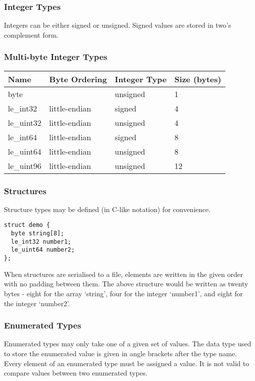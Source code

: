 \documentclass[10pt]{article}
\begin{document}
\subsubsection{Integer Types}
Integers can be either signed or unsigned.
Signed values are stored in two's complement form.

\subsubsection{Multi-byte Integer Types}
\begin{center}
\begin{tabular}{l l l l}
\hline
\textbf{Name} & \textbf{Byte Ordering} & \textbf{Integer Type} & \textbf{Size (bytes)} \\
\hline
byte & & unsigned & 1 \\
le\_int32 & little-endian & signed & 4 \\
le\_uint32 & little-endian & unsigned & 4 \\
le\_int64 & little-endian & signed & 8 \\
le\_uint64 & little-endian & unsigned & 8 \\
le\_uint96 & little-endian & unsigned & 12 \\
\end{tabular}
\end{center}

\subsubsection{Structures}
Structure types may be defined (in C-like notation) for convenience.

\begin{verbatim}
struct demo {
  byte string[8];
  le_int32 number1;
  le_uint64 number2;
};
\end{verbatim}

When structures are serialised to a file, elements are written in the given order with no padding between them.
The above structure would be written as twenty bytes - eight for the array `string', four for the integer `number1',
and eight for the integer `number2'.

\subsubsection{Enumerated Types}
Enumerated types may only take one of a given set of values.
The data type used to store the enumerated value is given in angle brackets after the type name.
Every element of an enumerated type must be assigned a value.
It is not valid to compare values between two enumerated types.
\end{document}
